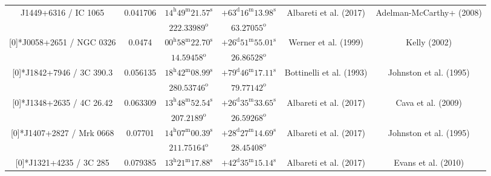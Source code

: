 \begin{landscape}
\begin{longtable}{cccccc}
 \multirow{2}[0]{*}{J1449+6316 / IC 1065} & \multirow{2}[0]{*}{0.041706} &  
    $14^\text{h}49^\text{m}21.57^\text{s}$  & $+63^\text{d}16^\text{m}13.98^\text{s}$  & 
    \multirow{2}[0]{*}{Albareti et al. (2017)\cite{RedRef9_2017}}& \multirow{2}[0]{*}{Adelman-McCarthy+ (2008) \cite{CoordRef28_2008}} \\*
    & & $222.33989^\text{o}$ & $63.27055^\text{o}$ & & \\ \addlinespace 
  \multirow{2}[0]{*}{J0058+2651 / NGC 0326} & \multirow{2}[0]{*}{0.0474} &  
    $00^\text{h}58^\text{m}22.70^\text{s}$  & $+26^\text{d}51^\text{m}55.01^\text{s}$  & 
    \multirow{2}[0]{*}{Werner et al. (1999)\cite{RedRef101_1999}}& \multirow{2}[0]{*}{Kelly (2002) \cite{CoordRef101_2002}} \\*
    & & $14.59458^\text{o}$ & $26.86528^\text{o}$ & & \\ \addlinespace 
  \multirow{2}[0]{*}{J1842+7946 / 3C 390.3} & \multirow{2}[0]{*}{0.056135} &  
    $18^\text{h}42^\text{m}08.99^\text{s}$  & $+79^\text{d}46^\text{m}17.11^\text{s}$  & 
    \multirow{2}[0]{*}{Bottinelli et al. (1993)\cite{RedRef1_1993}}& \multirow{2}[0]{*}{Johnston et al. (1995)\cite{CoordRef0_1995}} \\*
    & & $280.53746^\text{o}$ & $79.77142^\text{o}$ & & \\ \addlinespace 
  \multirow{2}[0]{*}{J1348+2635 / 4C 26.42} & \multirow{2}[0]{*}{0.063309} &  
    $13^\text{h}48^\text{m}52.54^\text{s}$  & $+26^\text{d}35^\text{m}33.65^\text{s}$  & 
    \multirow{2}[0]{*}{Albareti et al. (2017)\cite{RedRef9_2017}}& \multirow{2}[0]{*}{Cava et al. (2009)\cite{CoordRef56_2009}} \\*
    & & $207.2189^\text{o}$ & $26.59268^\text{o}$ & & \\ \addlinespace 
  \multirow{2}[0]{*}{J1407+2827 / Mrk 0668} & \multirow{2}[0]{*}{0.07701} &  
    $14^\text{h}07^\text{m}00.39^\text{s}$  & $+28^\text{d}27^\text{m}14.69^\text{s}$  & 
    \multirow{2}[0]{*}{Albareti et al. (2017)\cite{RedRef9_2017}}& \multirow{2}[0]{*}{Johnston et al. (1995)\cite{CoordRef0_1995}} \\*
    & & $211.75164^\text{o}$ & $28.45408^\text{o}$ & & \\ \addlinespace 
  \multirow{2}[0]{*}{J1321+4235 / 3C 285} & \multirow{2}[0]{*}{0.079385} &  
    $13^\text{h}21^\text{m}17.88^\text{s}$  & $+42^\text{d}35^\text{m}15.14^\text{s}$  & 
    \multirow{2}[0]{*}{Albareti et al. (2017)\cite{RedRef9_2017}}& \multirow{2}[0]{*}{Evans et al. (2010) \cite{CoordRef1_2010}} \\*

\end{longtable}
\end{landscape}
